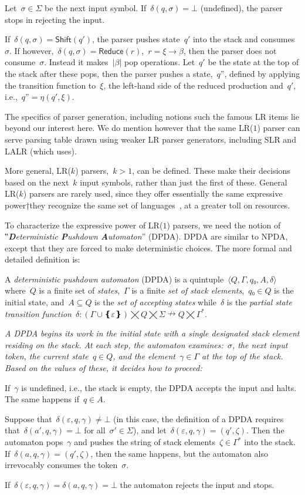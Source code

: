 Let~$σ∈Σ$ be the next input symbol.
If~$δ(q,σ)=⊥$ (undefined), the parser stops in rejecting the input.

If~$δ(q,σ) = \textsf{Shift}(q')$, the parser pushes state~$q'$ 
  into the stack and consumes~$σ$.
If however,~$δ(q,σ) = \textsf{Reduce}(r)$,~$r=ξ→β$,
  then the parser does not consume~$σ$. 
  Instead it makes~$|β|$ pop operations.
Let~$q'$ be the state at the top of the stack after these pops, then
  the parser pushes a state,~$q”$,
  defined by applying the transition function to~$ξ$, the left-hand side of the reduced production and~$q'$,
    i.e.,~$q”=η(q',ξ)$.

The specifics of parser generation, including notions such the famous LR items lie beyond our interest here.
We do mention however that the same LR($1$) parser can serve parsing table drawn using weaker LR parser generators,
  including SLR and LALR (which \Self uses).

More general, LR($k$) parsers,~$k>1$, can be defined. These make their
  decisions based on the next~$k$ input symbols, rather than just the first of these.
General LR($k$) parsers are rarely used, since they offer essentially
  the same expressive power†{they recognize the same set of languages~\cite{Knuth:65}}, 
   at a greater toll on resources.

To characterize the expressive power of LR($1$) parsers, we need the notion
of ‟\emph{\textbf Deterministic \textbf Pushdown \textbf Automaton}” (DPDA).
DPDA are similar to NPDA, except that they are forced
to make deterministic choices.
The more formal and detailed definition is:

\begin{Definition}
  \label{Definition:DPDA}
  A \emph{deterministic pushdown automaton} (DPDA) is a quintuple~$⟨Q,Γ,q₀,A,δ⟩$
  where~$Q$ is a finite set of
    \emph{states},~$Γ$ is a finite
  \emph{set of stack elements},~$q₀∈Q$ is the initial state,
  and~$A⊆Q$ is the \emph{set of accepting states} while~$δ$ is
  the \emph{partial state transition function}~$δ:(Γ∪❴ε❵)⨉Q⨉Σ↛Q⨉Γ^*$.
  \par\itshape
  A DPDA begins its work in the initial state with a single designated stack element residing on the stack. 
  At each step, the automaton examines:~$σ$, the next input token, the current state~$q∈Q$, and the element~$γ∈Γ$ at the top of the stack. Based on the values of these, it decides how to proceed:
  \par
  If~$γ$ is undefined, i.e., the stack is empty, the DPDA accepts the input and halts.
  The same happens if~$q∈A$.
  \par
  Suppose that~$δ(ε,q,γ)≠⊥$ (in this case, the definition of a DPDA requires that~$δ(a',q,γ)=⊥$ for all~$σ'∈Σ$),
  and let~$δ(ε,q,γ)=(q',ζ)$.
  Then the automaton pops~$γ$
  and pushes the string of stack elements~$ζ∈Γ^*$ into the stack.
  If~$δ(a,q,γ)=(q',ζ)$, then the same happens, but the
  automaton also irrevocably consumes the token~$σ$.
  \par
  If~$δ(ε,q,γ)=δ(a,q,γ)=⊥$ the automaton rejects the input and stops.
\end{Definition}

